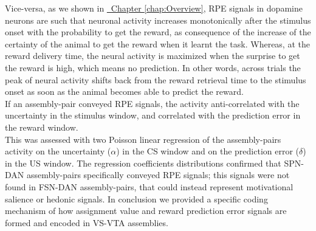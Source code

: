 \begin{itemize}
    Vice-versa, as we shown in \hyperref[chap:Overview]{~Chapter \ref*{chap:Overview}}, RPE signals in dopamine neurons are such that neuronal activity increases monotonically after the stimulus onset with the probability to get the reward, as consequence of the increase of the certainty of the animal to get the reward when it learnt the task. Whereas, at the reward delivery time, the neural activity is maximized when the surprise to get the reward is high, which means no prediction. In other words, across trials the peak of neural activity shifts back from the reward retrieval time to the stimulus onset as soon as the animal becomes able to predict the reward.\\If an assembly-pair conveyed RPE signals, the activity anti-correlated with the uncertainty in the stimulus window, and correlated with the prediction error in the reward window.\\This was assessed with two Poisson linear regression of the assembly-pairs activity on the uncertainty ($\alpha$) in the CS window and on the prediction error ($\delta$) in the US window. The regression coefficients distributions confirmed that SPN-DAN assembly-pairs specifically conveyed RPE signals; this signals were not found in FSN-DAN assembly-pairs, that could instead represent motivational salience or hedonic signals. In conclusion we provided a specific coding mechanism of how assignment value and reward prediction error signals are formed and encoded in VS-VTA assemblies. 
\end{itemize}
  